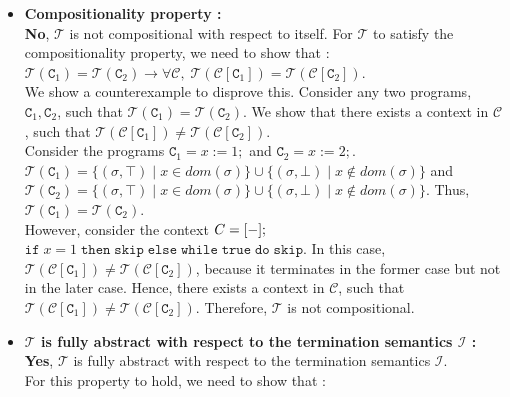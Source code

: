 \documentclass{article}
\newcommand{\C}{\mathtt{C}}
\newcommand{\true}{\mathtt{true}}
\newcommand{\ifsym}{\mathtt{if}}
\newcommand{\then}{\mathtt{then}}
\newcommand{\elsesym}{\mathtt{else}}
\newcommand{\whilesym}{\mathtt{while}}
\newcommand{\dosym}{\mathtt{do}}
\newcommand{\skipsym}{\mathtt{skip}}
\begin{document}
\begin{enumerate}
\begin{enumerate}
\begin{itemize}
\item \textbf{Compositionality property :}\\

	\textbf{No}, $\mathcal{T}$ is not compositional with respect to itself.
	For $\mathcal{T}$ to satisfy the compositionality property, 
	we need to show that :\\
	
	$\mathcal{T}(\C_1) = \mathcal{T}(\C_2) \rightarrow 
	\forall \mathcal{C}, \;	
	\mathcal{T}(\mathcal{C}[\C_1]) = \mathcal{T}(\mathcal{C}[\C_2])$.\\

	We show a counterexample to disprove this. Consider	any two programs,
	$\C_1,\C_2$, such that $\mathcal{T}(\C_1) = \mathcal{T}(\C_2)$.
	We show that there exists a context in $\mathcal{C}$, such that
	$\mathcal{T}(\mathcal{C}[\C_1]) \neq \mathcal{T}(\mathcal{C}[\C_2])$.\\
			
	Consider the programs $\C_1 = x := 1; $ and $\C_2 = x := 2;$.\\
	$\mathcal{T}(\C_1) = \{ (\sigma, \top) \; | \; x \in dom(\sigma) \} 
	\cup \{ (\sigma, \bot) \; | \; x \notin dom(\sigma) \}$ and\\ 
	$\mathcal{T}(\C_2) = \{ (\sigma, \top) \; | \; x \in dom(\sigma) \} 
	\cup \{ (\sigma, \bot) \; | \; x \notin dom(\sigma) \}$. 
	Thus, $\mathcal{T}(\C_1) = \mathcal{T}(\C_2) $.\\
	
	However, consider the context $C = [ \-- ];$ $\ifsym \; x = 1 \; \then \;
	\skipsym \; \elsesym \; \whilesym \; \true \; \dosym \; \skipsym$.
	In this case,  $\mathcal{T}(\mathcal{C}[\C_1]) \neq \mathcal{T}(\mathcal{C}
	[\C_2])$, because it terminates in the former case but not in the later
	case. Hence, there exists a context in $\mathcal{C}$, such that
	$\mathcal{T}(\mathcal{C}[\C_1]) \neq \mathcal{T}(\mathcal{C}[\C_2])$.
	Therefore, $\mathcal{T}$ is not compositional. \\

\item \textbf{$\mathcal{T}$ is fully abstract with respect to the termination
semantics $\mathcal{I}$ :}\\

	\textbf{Yes}, $\mathcal{T}$ is fully abstract with respect to the termination
	semantics $\mathcal{I}$.\\

	For this property to hold, we need to show that :
	

\end{itemize}
\end{enumerate}
\end{enumerate}
\end{document}
